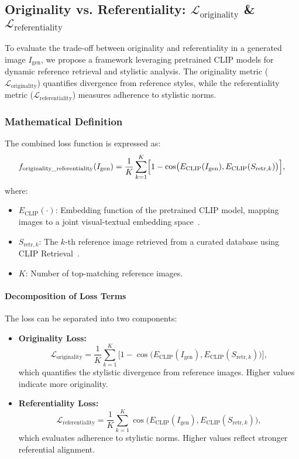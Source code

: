 \subsection{Originality vs. Referentiality: \(\mathcal{L}_{\text{originality}}\) \& \(\mathcal{L}_{\text{referentiality}}\)}

To evaluate the trade-off between originality and referentiality in a generated image \(I_{\text{gen}}\), we propose a framework leveraging pretrained CLIP models for dynamic reference retrieval and stylistic analysis. The originality metric (\(\mathcal{L}_{\text{originality}}\)) quantifies divergence from reference styles, while the referentiality metric (\(\mathcal{L}_{\text{referentiality}}\)) measures adherence to stylistic norms.


\subsubsection{Mathematical Definition}
The combined loss function is expressed as:
\[
f_{\text{originality\_referentiality}}(I_{\text{gen}}) = \frac{1}{K} \sum_{k=1}^K \Bigl[ 1 - \cos\bigl(E_{\text{CLIP}}(I_{\text{gen}}), E_{\text{CLIP}}(S_{\text{retr},k})\bigr) \Bigr],
\]
where:
\begin{itemize}
    \item \(E_{\text{CLIP}}(\cdot)\): Embedding function of the pretrained CLIP model, mapping images to a joint visual-textual embedding space~\cite{radford2021learning}.
    \item \(S_{\text{retr},k}\): The \(k\)-th reference image retrieved from a curated database using CLIP Retrieval~\cite{clip-retrieval-2023}.
    \item \(K\): Number of top-matching reference images.
\end{itemize}


\paragraph{Decomposition of Loss Terms}
The loss can be separated into two components:
\begin{itemize}
    \item \textbf{Originality Loss:}
    \[
    \mathcal{L}_{\text{originality}} = \frac{1}{K} \sum_{k=1}^K \bigl[1 - \cos\bigl(E_{\text{CLIP}}(I_{\text{gen}}), E_{\text{CLIP}}(S_{\text{retr},k})\bigr)\bigr],
    \]
    which quantifies the stylistic divergence from reference images. Higher values indicate more originality.
    \item \textbf{Referentiality Loss:}
    \[
    \mathcal{L}_{\text{referentiality}} = \frac{1}{K} \sum_{k=1}^K \cos\bigl(E_{\text{CLIP}}(I_{\text{gen}}), E_{\text{CLIP}}(S_{\text{retr},k})\bigr),
    \]
    which evaluates adherence to stylistic norms. Higher values reflect stronger referential alignment.
\end{itemize}


